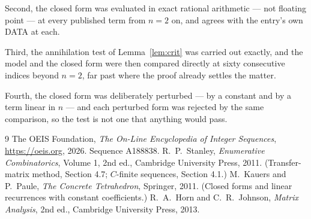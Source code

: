 \documentclass[11pt,a4paper]{article}
\theoremstyle{plain}
\theoremstyle{definition}
\begin{document}
Second, the closed form was evaluated in exact rational arithmetic --- not floating point ---
at every published term from $n=2$ on, and agrees with the entry's own DATA at each.

Third, the annihilation test of Lemma~\ref{lem:crit} was carried out exactly, and the model
and the closed form were then compared directly at sixty consecutive indices beyond
$n=2$, far past where the proof already settles the matter.

Fourth, the closed form was deliberately perturbed --- by a constant and by a term linear in
$n$ --- and each perturbed form was rejected by the same comparison, so the test is not one
that anything would pass.

\begin{thebibliography}{9}
 The OEIS Foundation, \emph{The On-Line Encyclopedia of Integer
Sequences}, \url{https://oeis.org}, 2026. Sequence A188838.
 R.~P.~Stanley, \emph{Enumerative Combinatorics}, Volume 1, 2nd ed.,
Cambridge University Press, 2011. (Transfer-matrix method, Section 4.7; $C$-finite sequences,
Section 4.1.)
 M.~Kauers and P.~Paule, \emph{The Concrete Tetrahedron}, Springer, 2011.
(Closed forms and linear recurrences with constant coefficients.)
 R.~A.~Horn and C.~R.~Johnson, \emph{Matrix Analysis}, 2nd ed., Cambridge
University Press, 2013.
\end{thebibliography}
\end{document}
